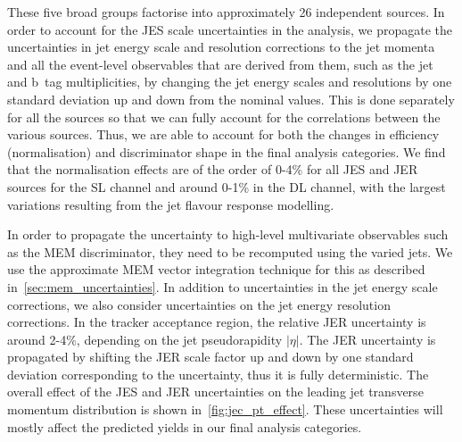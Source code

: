 These five broad groups factorise into approximately 26 independent sources. In order to account for the JES scale uncertainties in the analysis, we propagate the uncertainties in jet energy scale and resolution corrections to the jet momenta and all the event-level observables that are derived from them, such as the jet and b~tag multiplicities, by changing the jet energy scales and resolutions by one standard deviation up and down from the nominal values. This is done separately for all the sources so that we can fully account for the correlations between the various sources. Thus, we are able to account for both the changes in efficiency (normalisation) and discriminator shape in the final analysis categories. We find that the normalisation effects are of the order of 0-4\% for all JES and JER sources for the SL channel and around 0-1\% in the DL channel, with the largest variations resulting from the jet flavour response modelling.

In order to propagate the uncertainty to high-level multivariate observables such as the MEM discriminator, they need to be recomputed using the varied jets. We use the approximate MEM vector integration technique for this as described in~\cref{sec:mem_uncertainties}. In addition to uncertainties in the jet energy scale corrections, we also consider uncertainties on the jet energy resolution corrections. In the tracker acceptance region, the relative JER uncertainty is around 2-4\%, depending on the jet pseudorapidity $|\eta|$. The JER uncertainty is propagated by shifting the JER scale factor up and down by one standard deviation corresponding to the uncertainty, thus it is fully deterministic. The overall effect of the JES and JER uncertainties on the leading jet transverse momentum distribution is shown in~\cref{fig:jec_pt_effect}. These uncertainties will mostly affect the predicted yields in our final analysis categories.

